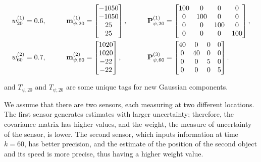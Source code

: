 \begin{alignat}{3}
    w_{20}^{(1)}
    &= 0.6,
    &\qquad
    \svecat{m}{\psi, 20}{(1)}
    &= \begin{bmatrix}
        -1050 \\
        -1050 \\
        25 \\
        25
    \end{bmatrix},
    &\qquad
    \svecat{P}{\psi, 20}{(1)}
    &= \begin{bmatrix}
        100 & 0 & 0 & 0 \\
        0 & 100 & 0 & 0 \\
        0 & 0 & 100 & 0 \\
        0 & 0 & 0 & 100
    \end{bmatrix}, \\
    w_{60}^{(2)}
    &= 0.7,
    &\qquad
    \svecat{m}{\psi, 60}{(2)}
    &= \begin{bmatrix}
        1020 \\
        1020 \\
        -22 \\
        -22
    \end{bmatrix},
    &\qquad
    \svecat{P}{\psi, 60}{(3)}
    &= \begin{bmatrix}
        40 & 0 & 0 & 0 \\
        0 & 40 & 0 & 0 \\
        0 & 0 & 5 & 0 \\
        0 & 0 & 0 & 5
    \end{bmatrix}.
\end{alignat}

\noindent and $T_{\psi, 20}$ and $T_{\psi, 20}$ are some unique tags for new Gaussian components.

We assume that there are two sensors, each measuring at two different locations. The first sensor generates estimates with larger uncertainty; therefore, the covariance matrix has higher values, and the weight, the measure of uncertainty of the sensor, is lower. The second sensor, which inputs information at time $k=60$, has better precision, and the estimate of the position of the second object and its speed is more precise, thus having a higher weight value.
